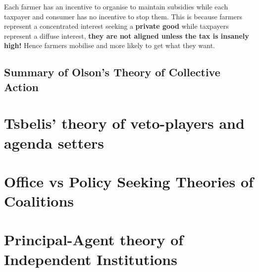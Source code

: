 \documentclass[12pt, letterpaper]{article}
\begin{document}
Each farmer has an incentive to organise to maintain subsidies while each taxpayer and consumer has no incentive to stop them. This is because farmers represent a concentrated interest seeking a \textbf{private good} while taxpayers represent a diffuse interest, \textbf{they are not aligned unless the tax is insanely high!} Hence farmers mobilise and more likely to get what they want.

\subsection{Summary of Olson's Theory of Collective Action}


\newpage
\section{Tsbelis' theory of veto-players and agenda setters}


\newpage
\section{Office vs Policy Seeking Theories of Coalitions}


\newpage
\section{Principal-Agent theory of Independent Institutions}
\end{document}
